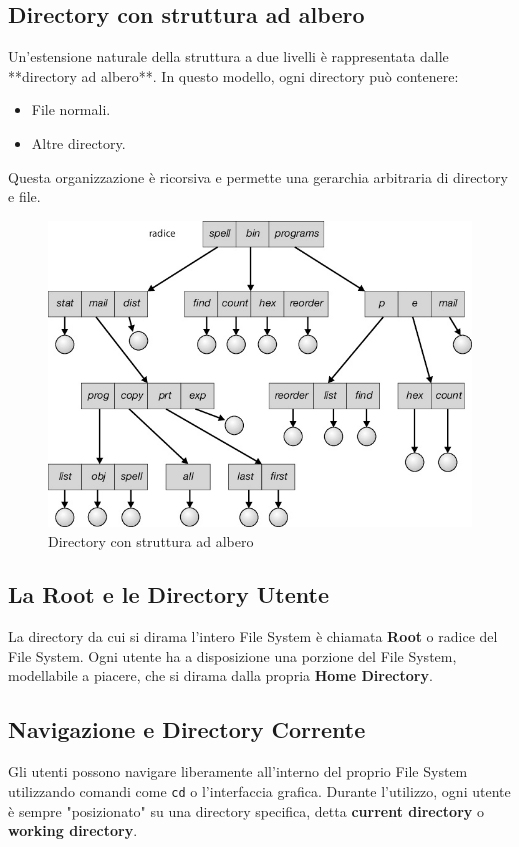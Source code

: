 \subsection{Directory con struttura ad albero}
Un’estensione naturale della struttura a due livelli è rappresentata dalle **directory ad albero**. In questo modello, ogni directory può contenere:
\begin{itemize}
    \item File normali.
    \item Altre directory.
\end{itemize}

Questa organizzazione è ricorsiva e permette una gerarchia arbitraria di directory e file.

\begin{figure}[h] \centering \includegraphics[width=0.50\linewidth]{images/dir_treeLevel.png} \caption{Directory con struttura ad albero} \end{figure}

\subsection{La Root e le Directory Utente}
La directory da cui si dirama l'intero File System è chiamata \textbf{Root} o radice del File System. Ogni utente ha a disposizione una porzione del File System, modellabile a piacere, che si dirama dalla propria \textbf{Home Directory}. 


\subsection{Navigazione e Directory Corrente}
Gli utenti possono navigare liberamente all'interno del proprio File System utilizzando comandi come \texttt{cd} o l'interfaccia grafica. Durante l'utilizzo, ogni utente è sempre "posizionato" su una directory specifica, detta \textbf{current directory} o \textbf{working directory}. 

